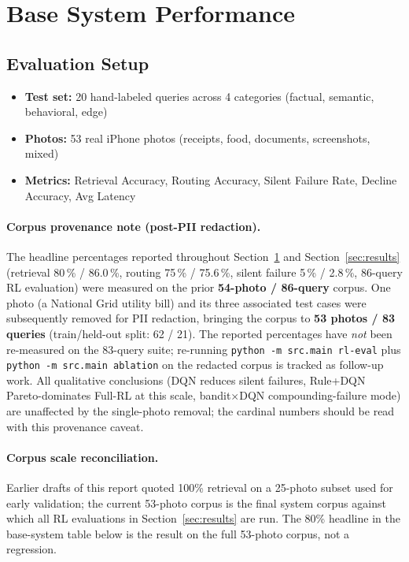 \documentclass[11pt,letterpaper]{article}
\begin{document}
\section{Base System Performance}
\label{sec:base-performance}

\subsection{Evaluation Setup}

\begin{itemize}[nosep]
  \item \textbf{Test set:} 20 hand-labeled queries across 4 categories (factual, semantic, behavioral, edge)
  \item \textbf{Photos:} 53 real iPhone photos (receipts, food, documents, screenshots, mixed)
  \item \textbf{Metrics:} Retrieval Accuracy, Routing Accuracy, Silent Failure Rate, Decline Accuracy, Avg Latency
\end{itemize}

\paragraph{Corpus provenance note (post-PII redaction).} The headline percentages reported throughout Section~\ref{sec:base-performance} and Section~\ref{sec:results} (retrieval 80\,\% / 86.0\,\%, routing 75\,\% / 75.6\,\%, silent failure 5\,\% / 2.8\,\%, 86-query RL evaluation) were measured on the prior \textbf{54-photo / 86-query} corpus. One photo (a National Grid utility bill) and its three associated test cases were subsequently removed for PII redaction, bringing the corpus to \textbf{53 photos / 83 queries} (train/held-out split: 62 / 21). The reported percentages have \emph{not} been re-measured on the 83-query suite; re-running \texttt{python -m src.main rl-eval} plus \texttt{python -m src.main ablation} on the redacted corpus is tracked as follow-up work. All qualitative conclusions (DQN reduces silent failures, Rule+DQN Pareto-dominates Full-RL at this scale, bandit$\times$DQN compounding-failure mode) are unaffected by the single-photo removal; the cardinal numbers should be read with this provenance caveat.

\paragraph{Corpus scale reconciliation.} Earlier drafts of this report quoted 100\% retrieval on a 25-photo subset used for early validation; the current 53-photo corpus is the final system corpus against which all RL evaluations in Section~\ref{sec:results} are run. The 80\% headline in the base-system table below is the result on the full 53-photo corpus, not a regression.
\end{document}
